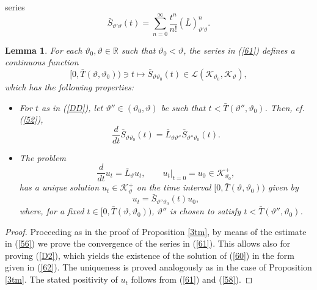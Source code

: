 \documentclass[reqno,11pt]{amsart}
\newtheorem{lemma}[theorem]{Lemma}
\theoremstyle{definition}
\theoremstyle{remark}
\numberwithin{equation}{section}
\begin{document}
series
\begin{equation}
  \label{61}
\bar{S}_{\vartheta'\vartheta} (t) = \sum_{n=0}^\infty \frac{t^n}{n!}
\left(\bar{L}\right)^n_{\vartheta'\vartheta}.
\end{equation}
\begin{lemma}
  \label{A1lm}
For each $\vartheta_0, \vartheta\in \mathds{R}$ such that
$\vartheta_0 < \vartheta$, the series in (\ref{61}) defines a
continuous function
\begin{equation}
  \label{DD}
[0, \bar{T}(\vartheta, \vartheta_0) ) \ni t \mapsto
\bar{S}_{\vartheta\vartheta_0} (t) \in \mathcal{L}(
\mathcal{K}_{\vartheta_0}, \mathcal{K}_{\vartheta}),
\end{equation}
which has the following properties:
\begin{itemize}
  \item[{\it (a)}] For $t$ as in (\ref{DD}), let $\vartheta''\in (\vartheta_0, \vartheta)$ be such that
 $t< \bar{T}(\vartheta'',
\vartheta_0)$. Then, cf. (\ref{52}),
\begin{equation}
  \label{D2}
\frac{d}{dt}\bar{S}_{\vartheta\vartheta_0}(t) = \bar{L}_{\vartheta
\vartheta''} \bar{S}_{\vartheta''\vartheta_0} (t).
\end{equation}
  \item[{\it (b)}]
The problem
\begin{equation}
  \label{60}
 \frac{d}{dt} u_t = \bar{L}_\vartheta u_t , \qquad u_t|_{t=0} = u_0
 \in \mathcal{K}^+_{\vartheta_0},
\end{equation}
has a unique solution $u_t \in \mathcal{K}^+_{\vartheta}$ on the
time interval $[0, \bar{T}(\vartheta, \vartheta_0))$ given by
\begin{equation}
  \label{62}
  u_t = \bar{S}_{\vartheta''\vartheta_0} (t)u_0,
\end{equation}
where, for a fixed $t \in [0, \bar{T}(\vartheta, \vartheta_0))$,
$\vartheta''$ is chosen to satisfy $t< \bar{T}(\vartheta'',
\vartheta_0)$.
\end{itemize}
\end{lemma}
\begin{proof}
Proceeding as in the proof of Proposition \ref{3tm}, by means of the
estimate in (\ref{56}) we prove the convergence of the series in
(\ref{61}). This allows also for proving (\ref{D2}), which yields
the existence of the solution of (\ref{60}) in the form given in
(\ref{62}). The uniqueness is proved analogously as in the case of
Proposition \ref{3tm}. The stated positivity of $u_t$ follows from
(\ref{61}) and (\ref{58}).
\end{proof}
\end{document}
